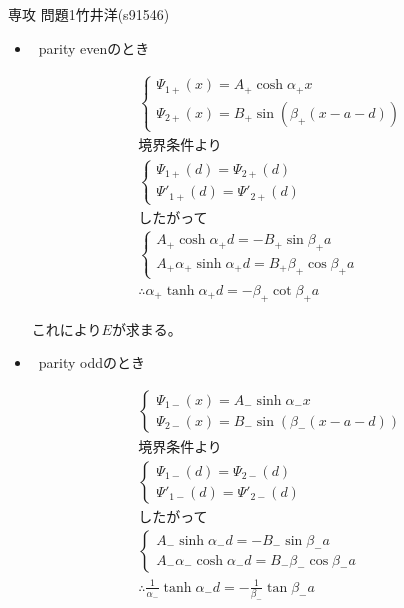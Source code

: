 \documentclass[fleqn]{jbook}
\begin{document}
\begin{answer}{専攻 問題1}{竹井洋(s91546)}
\begin{subanswers}
\begin{itemize}

\item ~parity evenのとき

\begin{gather*}
\begin{cases}
\Psi_{1+}(x)=A_+\cosh\alpha_+x \\
\Psi_{2+}(x)=B_+\sin\left(\beta_+(x-a-d)\right)
\end{cases}
\\
\text{境界条件より}
\\
\begin{cases}
\Psi_{1+}(d)=\Psi_{2+}(d) \\
\Psi'_{1+}(d)=\Psi'_{2+}(d)
\end{cases}
\\
\text{したがって}
\\
\begin{cases}
A_+\cosh\alpha_+d=-B_+\sin\beta_+a \\
A_+\alpha_+\sinh\alpha_+d=B_+\beta_+\cos\beta_+a
\end{cases}
\\
\therefore \alpha_+\tanh\alpha_+d=-\beta_+\cot\beta_+a
\end{gather*}

これにより$E$が求まる。

\item ~parity oddのとき

\begin{gather*}
\begin{cases}
\Psi_{1-}(x)=A_-\sinh\alpha_-x \\
\Psi_{2-}(x)=B_-\sin\left(\beta_-(x-a-d)\right)
\end{cases}
\\
\text{境界条件より}
\\
\begin{cases}
\Psi_{1-}(d)=\Psi_{2-}(d) \\
\Psi'_{1-}(d)=\Psi'_{2-}(d)
\end{cases}
\\
\text{したがって}
\\
\begin{cases}
A_-\sinh\alpha_-d=-B_-\sin\beta_-a \\
A_-\alpha_-\cosh\alpha_-d=B_-\beta_-\cos\beta_-a
\end{cases}
\\
\therefore \frac{1}{\alpha_-}\tanh\alpha_-d=-\frac{1}{\beta_-}\tan\beta_-a
\end{gather*}


\end{itemize}
\end{subanswers}
\end{answer}
\end{document}
